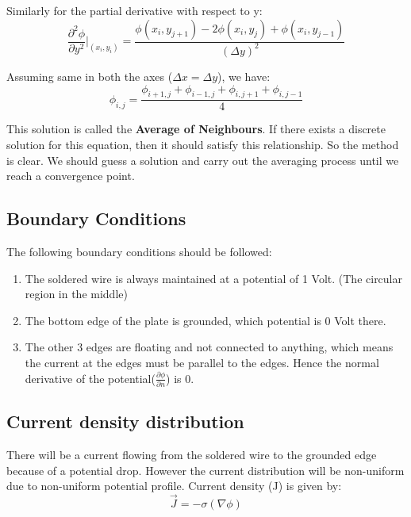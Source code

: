 \documentclass[12pt, a4paper]{article}
\begin{document}
Similarly for the partial derivative with respect to y:
\begin{equation*}
    \frac{\partial ^{2}\phi}{\partial y^{2}} \bigg\rvert _ {(x_{i},y_{i})} = \frac{\phi (x_{i},y_{j+1}) - 2\phi (x_{i},y_{j}) + \phi (x_{i},y_{j-1})}{(\Delta y)^{2}}
\end{equation*}

Assuming same in both the axes ($\Delta x = \Delta y$), we have:
\begin{equation*}
    \phi _{i,j} = \frac{\phi _{i+1,j} + \phi _{i-1,j} + \phi _{i,j+1} + \phi _{i,j-1}}{4}
\end{equation*}

This solution is called the \textbf{Average of Neighbours}. If there exists a discrete solution for this equation, then it should satisfy this relationship. So the method is clear.
We should guess a solution and carry out the averaging process until we reach a convergence point.

\subsection{Boundary Conditions}
The following boundary conditions should be followed:
\vspace{-0.3cm}
\begin{enumerate}
    \item The soldered wire is always maintained at a potential of 1 Volt. (The circular region in the middle)
    \item The bottom edge of the plate is grounded, which potential is 0 Volt there.
    \item The other 3 edges are floating and not connected to anything, which means the current at the edges must be parallel to the edges.
Hence the normal derivative of the potential($\frac{\partial \phi}{\partial n}$) is 0.
\end{enumerate}

\subsection{Current density distribution}
There will be a current flowing from the soldered wire to the grounded edge because of a potential drop. However the current distribution will be non-uniform due to non-uniform potential profile.
Current density (J) is given by:
\begin{equation*}
    \vec{J} = -\sigma (\nabla \phi)
\end{equation*}
\end{document}
